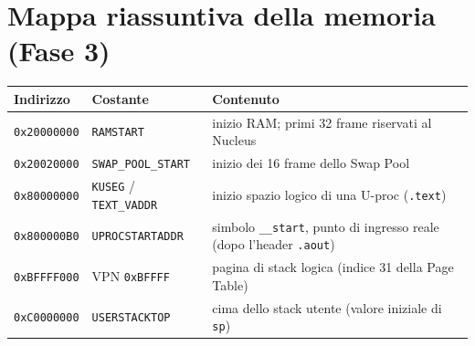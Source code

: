 \documentclass[11pt,a4paper]{article}
\newcommand{\code}[1]{\texttt{#1}}
\begin{document}
\section{Mappa riassuntiva della memoria (Fase 3)}
\begin{center}
\begin{tabular}{@{}lll@{}}
\toprule
\textbf{Indirizzo} & \textbf{Costante} & \textbf{Contenuto} \\
\midrule
\code{0x20000000} & \code{RAMSTART} & inizio RAM; primi 32 frame riservati al Nucleus \\
\code{0x20020000} & \code{SWAP\_POOL\_START} & inizio dei 16 frame dello Swap Pool \\
\code{0x80000000} & \code{KUSEG} / \code{TEXT\_VADDR} & inizio spazio logico
  di una U-proc (\code{.text}) \\
\code{0x800000B0} & \code{UPROCSTARTADDR} & simbolo \code{\_\_start}, punto
  di ingresso reale (dopo l'header \code{.aout}) \\
\code{0xBFFFF000} & VPN \code{0xBFFFF} & pagina di stack logica (indice 31
  della Page Table) \\
\code{0xC0000000} & \code{USERSTACKTOP} & cima dello stack utente (valore
  iniziale di \code{sp}) \\
\bottomrule
\end{tabular}
\end{center}
\end{document}
